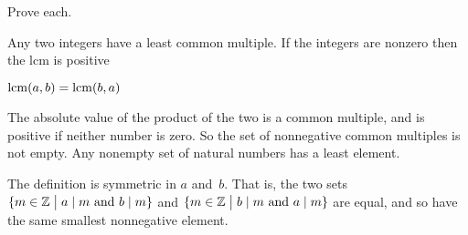 \documentclass{ibl}  %
\begin{document}
\begin{problem} Prove each.
\begin{items}
\item {} Any two integers have a least common multiple.
  If the integers are nonzero then the lcm is positive
\item {} $\operatorname{lcm}(a,b)=\operatorname{lcm}(b,a)$
\end{items}
\begin{answer}
\begin{items}
\item The absolute value of the product of the two is a common multiple,
  and is positive if neither number is zero.
  So the set of nonnegative common multiples is not empty.
  Any nonempty set of natural numbers has a least element.
\item The definition is symmetric in $a$ and~$b$.
  That is, the two sets
  $\{m\in\mathbb{Z} \bigm| \text{$a\mid m$ and $b\mid m$}\}$
  and     
  $\{m\in\mathbb{Z} \bigm| \text{$b\mid m$ and $a\mid m$}\}$
  are equal, and so have the same smallest nonnegative element.
\end{items}
\end{answer}
\end{problem}
\end{document}
